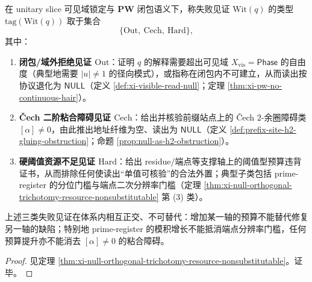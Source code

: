 \begin{definition}[失败见证的类型标签]\label{def:cdim-null-witness-tag}
在 unitary slice 可见域锁定与 \(\mathbf{PW}\) 闭包语义下，称失败见证 \(\mathrm{Wit}(q)\) 的类型
\(\mathrm{tag}(\mathrm{Wit}(q))\)
取于集合
\[
\{\mathrm{Out},\ \mathrm{Cech},\ \mathrm{Hard}\},
\]
其中：
\begin{enumerate}
  \item \textbf{闭包/域外拒绝见证 \(\mathrm{Out}\)}：证明 \(q\) 的解释需要超出可见域 \(X_{\mathrm{vis}}=\mathsf{Phase}\) 的自由度（典型地需要 \(|u|\neq 1\) 的径向模式），或指称在闭包内不可建立，从而读出按协议退化为 \(\mathsf{NULL}\)（定义 \ref{def:xi-visible-read-null}；定理 \ref{thm:xi-pw-no-continuous-hair}）。
  \item \textbf{\v{C}ech 二阶粘合障碍见证 \(\mathrm{Cech}\)}：给出并核验前缀站点上的 Čech \(2\)-余圈障碍类 \([\alpha]\neq 0\)，由此推出地址纤维为空、读出为 \(\mathsf{NULL}\)（定义 \ref{def:prefix-site-h2-gluing-obstruction}；命题 \ref{prop:null-as-h2-obstruction}）。
  \item \textbf{硬阈值资源不足见证 \(\mathrm{Hard}\)}：给出 residue/端点等支撑轴上的阈值型预算违背证书，从而排除任何使读出“单值可核验”的合法外置；典型子类包括 prime-register 的分位门槛与端点二次分辨率门槛（定理 \ref{thm:xi-null-orthogonal-trichotomy-resource-nonsubstitutable} 第 (3) 类）。
\end{enumerate}
\end{definition}

\begin{proposition}[不可替代性]\label{prop:cdim-null-witness-nonsubstitutable}
上述三类失败见证在体系内相互正交、不可替代：增加某一轴的预算不能替代修复另一轴的缺陷；特别地 prime-register 的模积增长不能抵消端点分辨率门槛，任何预算提升亦不能消去 \([\alpha]\neq 0\) 的粘合障碍。
\end{proposition}
\begin{proof}
见定理 \ref{thm:xi-null-orthogonal-trichotomy-resource-nonsubstitutable}。证毕。
\end{proof}

